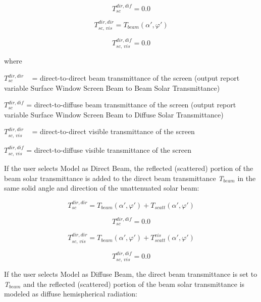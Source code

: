 \begin{equation}
T_{sc}^{dir,dif} = 0.0
\end{equation}

\begin{equation}
T_{sc,\,vis}^{dir,dir} = {T_{beam}}\left( {\alpha ',\varphi '} \right)
\end{equation}

\begin{equation}
T_{sc,\,vis}^{dir,dif} = 0.0
\end{equation}

where

\(T_{sc}^{dir,dir}\) ~ = direct-to-direct beam transmittance of the screen (output report variable Surface Window Screen Beam to Beam Solar Transmittance)

\(T_{sc}^{dir,dif}\) = direct-to-diffuse beam transmittance of the screen (output report variable Surface Window Screen Beam to Diffuse Solar Transmittance)

\(T_{sc,\,vis}^{dir,dir}\) ~ = direct-to-direct visible transmittance of the screen

\(T_{sc,\,vis}^{dir,dif}\) = direct-to-diffuse visible transmittance of the screen

If the user selects Model as Direct Beam, the reflected (scattered) portion of the beam solar transmittance is added to the direct beam transmittance \emph{T\(_{beam}\)} in the same solid angle and direction of the unattenuated solar beam:

\begin{equation}
T_{sc}^{dir,dir} = {T_{beam}}\left( {\alpha ',\varphi '} \right) + {T_{scatt}}\left( {\alpha ',\varphi '} \right)
\end{equation}

\begin{equation}
T_{sc}^{dir,dif} = 0.0
\end{equation}

\begin{equation}
T_{sc,\,vis}^{dir,dir} = {T_{beam}}\left( {\alpha ',\varphi '} \right) + T_{scatt}^{vis}\left( {\alpha ',\varphi '} \right)
\end{equation}

\begin{equation}
T_{sc,\,vis}^{dir,dif} = 0.0
\end{equation}

If the user selects Model as Diffuse Beam, the direct beam transmittance is set to \emph{T\(_{beam}\)} and the reflected (scattered) portion of the beam solar transmittance is modeled as diffuse hemispherical radiation:

